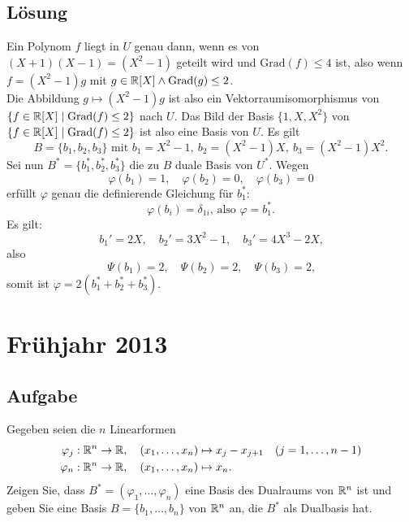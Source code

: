 \subsection{Lösung}
Ein Polynom \( f \) liegt in \( U \) genau dann, wenn es von \( (X+1)(X-1) = (X^2-1) \) geteilt wird und \( \text{Grad}(f) \leq 4 \) ist, also wenn \( f=(X^2-1)g \) mit \( g \in \mathbb{R}[X] \wedge \text{Grad}(g) \leq 2 \). \\
Die Abbildung \( g \mapsto (X^2-1)g \) ist also ein Vektorraumisomorphismus von \( \{ f \in \mathbb{R}[X] \mid \text{Grad}(f) \leq 2 \} \) nach \( U \). Das Bild der Basis \( \{1, X, X^2\} \) von \( \{ f \in \mathbb{R}[X] \mid \text{Grad}(f) \leq 2 \} \) ist also eine Basis von \( U \). Es gilt
\begin{equation*}
	B = \{ b_1, b_2, b_3 \} \text{ mit } b_1 = X^2-1, \ b_2 = (X^2-1)X, \ b_3 = (X^2-1)X^2\text{.}
\end{equation*}
Sei nun \( B^\ast = \{ b_1^\ast, b_2^\ast, b_3^\ast \} \) die zu \( B \) duale Basis von \( U^\ast \). Wegen
\begin{equation*}
	\varphi(b_1) = 1, \quad \varphi(b_2) = 0, \quad \varphi(b_3) = 0
\end{equation*}
erfüllt \( \varphi \) genau die definierende Gleichung für \( b_1^\ast \):
\begin{equation*}
	\varphi(b_i) = \delta_{1i}\text{, also } \varphi = b_1^\ast\text{.}
\end{equation*}
Es gilt:
\begin{equation*}
	b_1' = 2X, \quad b_2' = 3X^2-1, \quad b_3' = 4X^3-2X\text{,}
\end{equation*}
also
\begin{equation*}
	\Psi(b_1) = 2, \quad \Psi(b_2) = 2, \quad \Psi(b_3) = 2\text{,}
\end{equation*}
somit ist \( \varphi = 2(b_1^\ast + b_2^\ast + b_3^\ast) \).

\newpage


\section{Frühjahr 2013}

\subsection{Aufgabe}
Gegeben seien die \( n \) Linearformen
\begin{align*}
	\varphi_j &: \mathbb{R}^n \to \mathbb{R}, \quad (x_1, \dots, x_n) \mapsto x_j - x_{j+1} \quad (j = 1, \dots, n-1) \\
	\varphi_n &: \mathbb{R}^n \to \mathbb{R}, \quad (x_1, \dots, x_n) \mapsto x_n\text{.}
\end{align*}
Zeigen Sie, dass \( B^\ast = (\varphi_1, \dots, \varphi_n) \) eine Basis des Dualraums von \( \mathbb{R}^n \) ist und geben Sie eine Basis \( B = \{ b_1, \dots, b_n \} \) von \( \mathbb{R}^n \) an, die \( B^\ast \) als Dualbasis hat.

